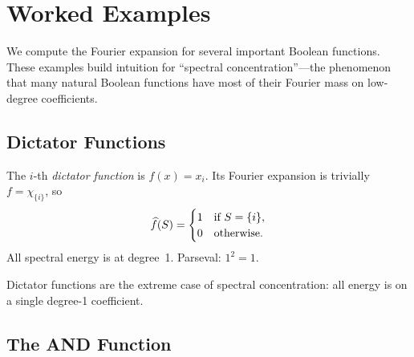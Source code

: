 \section{Worked Examples}\label{sec:fourier-examples}

We compute the Fourier expansion for several important Boolean functions.
These examples build intuition for ``spectral concentration''---the
phenomenon that many natural Boolean functions have most of their Fourier
mass on low-degree coefficients.

\subsection{Dictator Functions}\label{sec:dictator}

\begin{example}[Dictator]\label{ex:dictator}
The $i$-th \emph{dictator function} is $f(x) = x_i$. Its Fourier
expansion is trivially $f = \chi_{\{i\}}$, so
\[
  \widehat{f}(S) = \begin{cases} 1 & \text{if } S = \{i\}, \\ 0 & \text{otherwise.} \end{cases}
\]
All spectral energy is at degree~1. Parseval: $1^2 = 1$. \checkmark
\end{example}

Dictator functions are the extreme case of spectral concentration: all
energy is on a single degree-1 coefficient.


\subsection{The AND Function}\label{sec:and}

